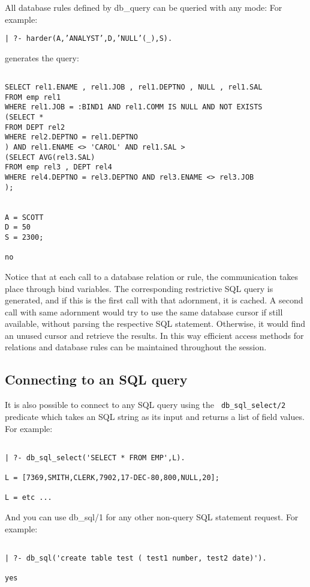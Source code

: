 All database rules defined by db\_query can be queried with any mode:
For example:
\begin{center}

{\tt | ?- harder(A,'ANALYST',D,'NULL'(\_),S).}
\end{center}

generates the query:
\begin{verbatim}

SELECT rel1.ENAME , rel1.JOB , rel1.DEPTNO , NULL , rel1.SAL
FROM emp rel1
WHERE rel1.JOB = :BIND1 AND rel1.COMM IS NULL AND NOT EXISTS
(SELECT *
FROM DEPT rel2
WHERE rel2.DEPTNO = rel1.DEPTNO
) AND rel1.ENAME <> 'CAROL' AND rel1.SAL > 
(SELECT AVG(rel3.SAL)
FROM emp rel3 , DEPT rel4
WHERE rel4.DEPTNO = rel3.DEPTNO AND rel3.ENAME <> rel3.JOB
);


A = SCOTT
D = 50
S = 2300;

no
\end{verbatim}

Notice that at each call to a database relation or rule, the
communication takes place through bind variables.  The corresponding
restrictive SQL query is generated, and if this is the first call with
that adornment, it is cached.  A second call with same adornment would
try to use the same database cursor if still available, without
parsing the respective SQL statement.  Otherwise, it would find an
unused cursor and retrieve the results.  In this way efficient access
methods for relations and database rules can be maintained throughout
the session.

\subsection{ Connecting to an SQL query}


It is also possible to connect to any SQL query using the {\tt
db\_sql\_select/2} predicate which takes an SQL string as its input and
returns a list of field values.  For example:
\begin{verbatim}

| ?- db_sql_select('SELECT * FROM EMP',L).

L = [7369,SMITH,CLERK,7902,17-DEC-80,800,NULL,20];

L = etc ...
\end{verbatim}

And you can use db\_sql/1 for any other non-query SQL statement request.  For 
example:
\begin{verbatim}

| ?- db_sql('create table test ( test1 number, test2 date)').

yes
\end{verbatim}

